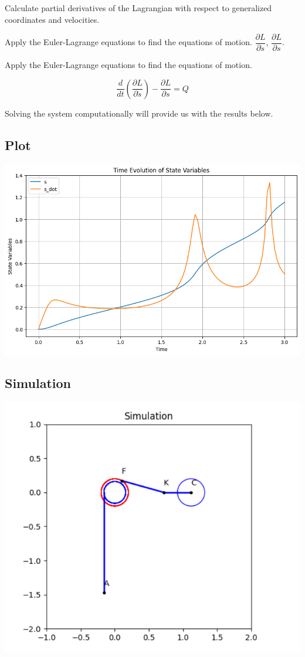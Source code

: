 \documentclass{article}
\begin{document}
Calculate partial derivatives of the Lagrangian with respect to generalized coordinates and velocities.

Apply the Euler-Lagrange equations to find the equations of motion.
$\dfrac{\partial L}{\partial \dot{s}}$, $\dfrac{\partial L}{\partial s}$.


Apply the Euler-Lagrange equations to find the equations of motion.


\[\frac{d}{dt} \left( \frac{\partial L}{\partial \dot{s}} \right) - \frac{\partial L}{\partial s} = Q\]

Solving the system computationally will provide us with the results below.

\subsection{Plot}

\includegraphics[scale=0.5]{plots/task1_plot.png}

\subsection{Simulation}

\includegraphics[scale=0.3]{simulation/hw8_simulation.png}{\centering}
\end{document}
